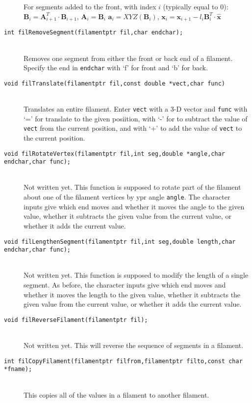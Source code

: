 \documentclass {book}
\newcommand {\ttt} {\texttt}
\begin{document}
\begin{description}
For segments added to the front, with index $i$ (typically equal to 0):
$\mathbf{B}_i = \mathbf{A}_{i+1}^T \cdot \mathbf{B}_{i+1}$,
$\mathbf{A}_i = \mathbf{B}_i$
$\mathbf{a}_i = XYZ(\mathbf{B}_i)$,
$\mathbf{x}_i = \mathbf{x}_{i+1} - l_i \mathbf{B}^T_i \cdot \mathbf{\hat{x}}$

\item[\ttt{int filRemoveSegment(filamentptr fil,char endchar);}]
\hfill \\
Removes one segment from either the front or back end of a filament. Specify the end in \ttt{endchar} with `f' for front and `b' for back.

\item[\ttt{void filTranslate(filamentptr fil,const double *vect,char func)}]
\hfill \\
Translates an entire filament. Enter \ttt{vect} with a 3-D vector and \ttt{func} with `=' for translate to the given posiition, with `-' for to subtract the value of \ttt{vect} from the current position, and with `+' to add the value of \ttt{vect} to the current position.

\item[\ttt{void filRotateVertex(filamentptr fil,int seg,double *angle,char endchar,char func);}]
\hfill \\
Not written yet. This function is supposed to rotate part of the filament about one of the filament vertices by ypr angle \ttt{angle}. The character inputs give which end moves and whether it moves the angle to the given value, whether it subtracts the given value from the current value, or whether it adds the current value.

\item[\ttt{void filLengthenSegment(filamentptr fil,int seg,double length,char endchar,char func);}]
\hfill \\
Not written yet. This function is supposed to modify the length of a single segment. As before, the character inputs give which end moves and whether it moves the length to the given value, whether it subtracts the given value from the current value, or whether it adds the current value.

\item[\ttt{void filReverseFilament(filamentptr fil);}]
\hfill \\
Not written yet. This will reverse the sequence of segments in a filament.

\item[\ttt{int filCopyFilament(filamentptr filfrom,filamentptr filto,const char *fname);}]
\hfill \\
This copies all of the values in a filament to another filament.


\end{description}
\end{document}

